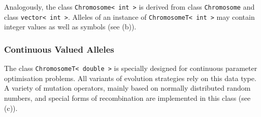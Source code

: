 Analogously, the class \verb+Chromosome< int >+ is derived from class
\verb+Chromosome+ and class \verb+vector< int >+.
Alleles of an instance of \texttt{ChromosomeT< int >} may
contain integer values as well as symbols (see
 (b)).


        \subsubsection{Continuous Valued Alleles}

The class \texttt{ChromosomeT< double >} is specially designed
for continuous parameter optimisation problems. All variants of
evolution strategies rely on this data type. A variety of mutation
operators, mainly based on normally distributed random numbers, and
special forms of recombination are implemented in this class (see
 (c)).


